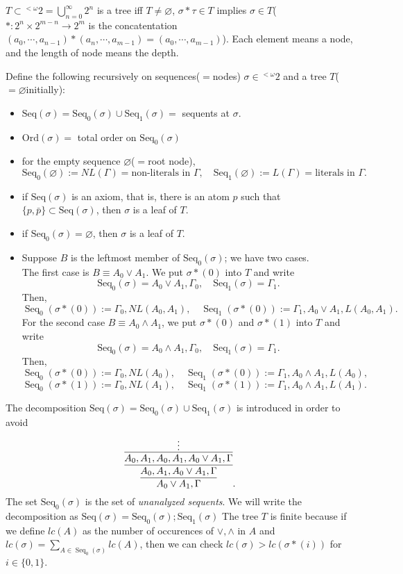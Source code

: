 \documentclass{../../small}
\DeclareMathOperator{\Seq}{Seq}
\begin{document}
\begin{pf}
$T\subset{}^{<\omega}2=\bigcup_{n=0}^\infty 2^n$ is a tree iff $T\ne\varnothing$, $\sigma*\tau\in T$ implies $\sigma\in T$($*:2^n\times 2^{m-n}\to 2^m$ is the concatentation $(a_0,\cdots,a_{n-1})*(a_n,\cdots,a_{m-1})=(a_0,\cdots,a_{m-1})$).
Each element means a node, and the length of node means the depth.

Define the following recursively on sequences($=$nodes)  $\sigma\in{}^{<\omega}2$ and a tree $T$($=\varnothing$initially):
\begin{itemize}
\item $\mathrm{Seq}(\sigma)=\mathrm{Seq}_0(\sigma)\cup\mathrm{Seq}_1(\sigma)=$ sequents at $\sigma$.
\item $\mathrm{Ord}(\sigma)=$ total order on $\mathrm{Seq}_0(\sigma)$
\item for the empty sequence $\varnothing$($=$root node),
\[\mathrm{Seq}_0(\varnothing):=NL(\Gamma)=\text{non-literals in $\Gamma$},\quad\mathrm{Seq}_1(\varnothing):=L(\Gamma)=\text{literals in $\Gamma$}.\]
\item if $\mathrm{Seq}(\sigma)$ is an axiom, that is, there is an atom $p$ such that $\{p,\bar p\}\subset\mathrm{Seq}(\sigma)$, then $\sigma$ is a leaf of $T$.
\item if $\mathrm{Seq}_0(\sigma)=\varnothing$, then $\sigma$ is a leaf of $T$.
\item Suppose $B$ is the leftmost member of $\mathrm{Seq}_0(\sigma)$; we have two cases.\\
The first case is $B\equiv A_0\vee A_1$.
We put $\sigma*(0)$ into $T$ and write
\[\mathrm{Seq}_0(\sigma)=A_0\vee A_1,\Gamma_0,\quad\mathrm{Seq}_1(\sigma)=\Gamma_1.\]
Then,
\[\Seq_0(\sigma*(0)):=\Gamma_0,NL(A_0,A_1),\quad\Seq_1(\sigma*(0)):=\Gamma_1,A_0\vee A_1,L(A_0,A_1).\]
For the second case $B\equiv A_0\wedge A_1$, we put $\sigma*(0)$ and $\sigma*(1)$ into $T$ and write
\[\mathrm{Seq}_0(\sigma)=A_0\wedge A_1,\Gamma_0,\quad\mathrm{Seq}_1(\sigma)=\Gamma_1.\]
Then,
\[\Seq_0(\sigma*(0)):=\Gamma_0,NL(A_0),\quad\Seq_1(\sigma*(0)):=\Gamma_1,A_0\wedge A_1,L(A_0),\]
\[\Seq_0(\sigma*(1)):=\Gamma_0,NL(A_1),\quad\Seq_1(\sigma*(1)):=\Gamma_1,A_0\wedge A_1,L(A_1).\]
\end{itemize}
The decomposition $\mathrm{Seq}(\sigma)=\mathrm{Seq}_0(\sigma)\cup\mathrm{Seq}_1(\sigma)$ is introduced in order to avoid
\[\infer{A_0\vee A_1,\Gamma}{\infer{A_0,A_1,A_0\vee A_1,\Gamma}{\infer{A_0,A_1,A_0,A_1,A_0\vee A_1,\Gamma}{\vdots}}}.\]
The set $\mathrm{Seq}_0(\sigma)$ is the set of \emph{unanalyzed sequents}.
We will write the decomposition as $\mathrm{Seq}(\sigma)=\mathrm{Seq}_0(\sigma);\mathrm{Seq}_1(\sigma)$
The tree $T$ is finite because if we define $lc(A)$ as the number of occurences of $\vee,\wedge$ in $A$ and $lc(\sigma)=\sum_{A\in\Seq_0(\sigma)} lc(A)$, then we can check $lc(\sigma)>lc(\sigma*(i))$ for $i\in\{0,1\}$.


\end{pf}
\end{document}
